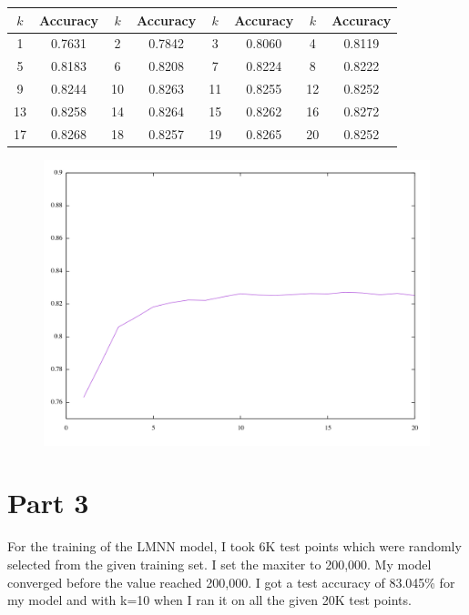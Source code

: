 \documentclass[a4paper,11pt]{article}
\begin{document}
\begin{mlsolution}
\begin{center}
\begin{tabular}{ |c|c|c|c|c|c|c|c| } 
 \hline
 $k$ & Accuracy & $k$ & Accuracy & $k$ & Accuracy & $k$ & Accuracy\\ \hline
 1 & 0.7631 & 2 & 0.7842 & 3 & 0.8060 & 4 & 0.8119 \\ 
 5 & 0.8183 & 6 & 0.8208 & 7 & 0.8224 & 8 & 0.8222 \\
 9 & 0.8244 & 10 & 0.8263 & 11 & 0.8255 & 12 & 0.8252 \\
 13 & 0.8258 & 14 & 0.8264 & 15 & 0.8262 & 16 & 0.8272\\
 17 & 0.8268 & 18 & 0.8257 & 19 & 0.8265 & 20 & 0.8252 \\ 
 \hline
\end{tabular}
\end{center}

\begin{figure}[th]%
\centering
\includegraphics[scale = 0.5]{q62_plot.png}%
\label{fig:proto}%
\end{figure}

\section*{Part 3}
For the training of the LMNN model, I took 6K test points which were randomly selected from the given training set. I set the maxiter to 200,000. My model converged before the value reached 200,000. I got a test accuracy of 83.045\% for my model and with k=10 when I ran it on all the given 20K test points.

\end{mlsolution}
					
\end{document}
